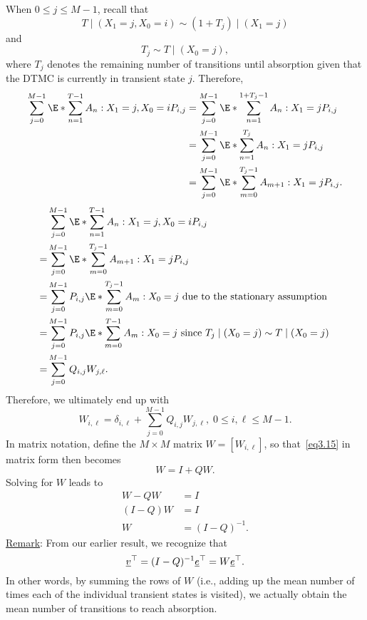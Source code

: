 \begin{Regular}
    When $0 \leq j \leq M-1$, recall that
    \[
        T\mid(X_{1}=j, X_{0}=i) \sim(1+T_{j})\mid(X_{1}=j)
    \]
    and
    \[
        T_{j} \sim T \mid(X_{0}=j),
    \]
    where $T_{j}$ denotes the remaining number of transitions until absorption given that the DTMC is currently in transient state $j$. Therefore,
    \begin{align*}
        \sum_{j=0}^{M-1} \E*{\sum_{n=1}^{T-1} A_{n} \given X_{1}=j, X_{0}=i} P_{i, j}
         & =\sum_{j=0}^{M-1} \E*{\sum_{n=1}^{1+T_{j}-1} A_{n} \given X_{1}=j} P_{i, j} \\
         & =\sum_{j=0}^{M-1} \E*{\sum_{n=1}^{T_{j}} A_{n} \given X_{1}=j} P_{i, j}     \\
         & =\sum_{j=0}^{M-1} \E*{\sum_{m=0}^{T_{j}-1} A_{m+1}\given X_{1}=j} P_{i, j}.
    \end{align*}
    \begin{align*}
          & \sum_{j=0}^{M-1} \E*{\sum_{n=1}^{T-1} A_{n} \given X_{1}=j, X_{0}=i} P_{i, j}                                              \\
        = & \sum_{j=0}^{M-1} \E*{\sum_{m=0}^{T_{j}-1} A_{m+1}\given X_{1}=j} P_{i, j}                                                  \\
        = & \sum_{j=0}^{M-1} P_{i, j} \E*{\sum_{m=0}^{T_{j}-1} A_{m} \given X_{0}=j} \text{ due to the stationary assumption }         \\
        = & \sum_{j=0}^{M-1} P_{i, j} \E*{\sum_{m=0}^{T-1} A_{m} \given X_{0}=j} \text{ since } T_{j}\mid(X_{0}=j) \sim T\mid(X_{0}=j) \\
        = & \sum_{j=0}^{M-1} Q_{i, j} W_{j,\ell}.
    \end{align*}
    Therefore, we ultimately end up with
    \[ W_{i,\ell}=\delta_{i,\ell}+\sum_{j=0}^{M-1} Q_{i,j}W_{j,\ell},\;0\le i,\ell\le M-1.\label{eq3.15}\tag*{(3.15)} \]
    In matrix notation, define the $ M\times M $ matrix $ W=[W_{i,\ell}] $, so that~\ref{eq3.15} in matrix form then becomes
    \[ W=I+QW. \]
    Solving for $ W $ leads to
    \begin{align*}
        W-QW   & =I           \\
        (I-Q)W & =I           \\
        W      & =(I-Q)^{-1}.
    \end{align*}
    \tcblower{}
    \underline{Remark}: From our earlier result, we recognize that
    \[ \underline{v}^\top=(I-Q)^{-1}\underline{e}^\top=W \underline{e}^\top. \]
    In other words, by summing the rows of $W$ (i.e., adding up the mean number of times each of
    the individual transient states is visited), we actually obtain the mean number of transitions to
    reach absorption.
\end{Regular}
